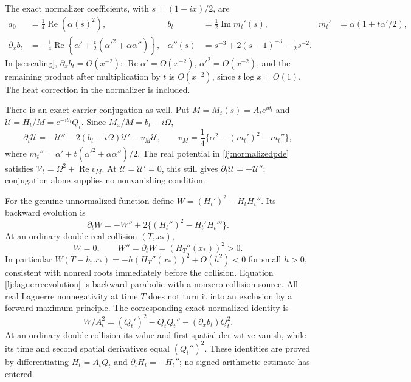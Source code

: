 \documentclass[11pt]{article}
\numberwithin{equation}{section}
\theoremstyle{definition}
\theoremstyle{remark}
\DeclareMathOperator{\Rea}{Re}
\DeclareMathOperator{\Ima}{Im}
\begin{document}
The exact normalizer coefficients, with \(s=(1-ix)/2\), are
\begin{align}
 a_0&=\frac14\Rea(\alpha(s)^2),&
 b_t&=\frac12\Ima m_t'(s),&
 m_t'&=\alpha(1+t\alpha'/2),\nonumber\\
 \partial_xb_t
   &=-\frac14\Rea\left\{\alpha'
        +\frac t2(\alpha'^2+\alpha\alpha'')\right\},&
 \alpha''(s)&=s^{-3}+2(s-1)^{-3}-\frac12s^{-2}.
 \label{lj:bx}
\end{align}
In \eqref{sc:scaling}, \(\partial_xb_t=O(x^{-2})\):
\(\Rea\alpha'=O(x^{-2})\),
\(\alpha'^2=O(x^{-2})\), and the remaining product after
multiplication by \(t\) is \(O(x^{-2})\), since \(t\log x=O(1)\).
The heat correction in the normalizer is included.

There is an exact carrier conjugation as well. Put
\(M=M_t(s)=A_te^{i\theta_t}\) and
\(\mathcal U=H_t/M=e^{-i\theta_t}Q_t\). Since
\(M_x/M=b_t-i\Omega\),
\begin{equation}\label{lj:carrierpde}
 \partial_t\mathcal U=-\mathcal U''-2(b_t-i\Omega)\mathcal U'
                       -v_M\mathcal U,\qquad
 v_M=\frac14\{\alpha^2-(m_t')^2-m_t''\},
\end{equation}
where \(m_t''=\alpha'+t(\alpha'^2+\alpha\alpha'')/2\).
The real potential in \eqref{lj:normalizedpde} satisfies
\(\mathcal V_t=\Omega^2+\Rea v_M\).
At \(\mathcal U=\mathcal U'=0\), this still gives
\(\partial_t\mathcal U=-\mathcal U''\); conjugation alone supplies
no nonvanishing condition.

For the genuine unnormalized function define
\(W=(H_t')^2-H_tH_t''\). Its backward evolution is
\begin{equation}\label{lj:laguerreevolution}
 \partial_tW=-W''+2\{(H_t'')^2-H_t'H_t'''\}.
\end{equation}
At an ordinary double real collision \((T,x_*)\),
\[
 W=0,\qquad W''=\partial_tW=(H_T''(x_*))^2>0.
\]
In particular \(W(T-h,x_*)=-h(H_T''(x_*))^2+O(h^2)<0\)
for small \(h>0\), consistent with nonreal roots immediately before
the collision. Equation \eqref{lj:laguerreevolution} is backward
parabolic with a nonzero collision source. All-real Laguerre
nonnegativity at time \(T\) does not turn it into an exclusion by a
forward maximum principle.
The corresponding exact normalized identity is
\begin{equation}\label{lj:normalizedlaguerre}
 W/A_t^2=(Q_t')^2-Q_tQ_t''-(\partial_xb_t)Q_t^2.
\end{equation}
At an ordinary double collision its value and first spatial derivative
vanish, while its time and second spatial derivatives equal
\((Q_t'')^2\). These identities are proved by differentiating
\(H_t=A_tQ_t\) and \(\partial_tH_t=-H_t''\); no signed arithmetic
estimate has entered.
\end{document}

